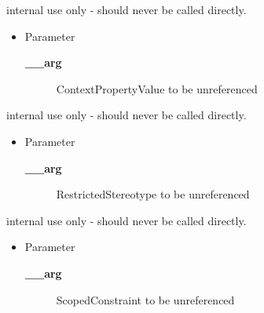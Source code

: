 \begin{desc}internal use only - should never be called directly.
\begin{itemize}
\item{Parameter
  \begin{description}
   \item[{\bf \_\_arg}]{ContextPropertyValue to be unreferenced}
  \end{description}}
\end{itemize}
\end{desc}

\begin{desc}internal use only - should never be called directly.
\begin{itemize}
\item{Parameter
  \begin{description}
   \item[{\bf \_\_arg}]{RestrictedStereotype to be unreferenced}
  \end{description}}
\end{itemize}
\end{desc}

\begin{desc}internal use only - should never be called directly.
\begin{itemize}
\item{Parameter
  \begin{description}
   \item[{\bf \_\_arg}]{ScopedConstraint to be unreferenced}
  \end{description}}
\end{itemize}
\end{desc}

